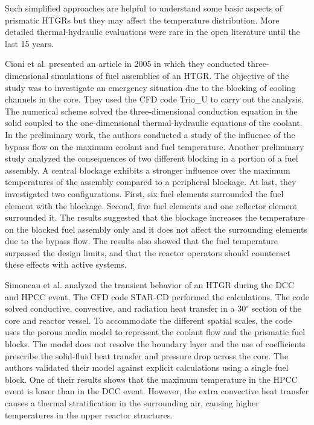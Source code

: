 \documentclass[11pt,letterpaper]{article}
\begin{document}
Such simplified approaches are helpful to understand some basic aspects of prismatic \glspl{HTGR} but they may affect the temperature distribution.
More detailed thermal-hydraulic evaluations were rare in the open literature until the last 15 years.

Cioni et al. \cite{cioni_3d_2006} presented an article in 2005 in which they conducted three-dimensional simulations of fuel assemblies of an \gls{HTGR}.
The objective of the study was to investigate an emergency situation due to the blocking of cooling channels in the core.
They used the \gls{CFD} code Trio_U \cite{bieder_priceles_2000} to carry out the analysis.
The numerical scheme solved the three-dimensional conduction equation in the solid coupled to the one-dimensional thermal-hydraulic equations of the coolant.
In the preliminary work, the authors conducted a study of the influence of the bypass flow on the maximum coolant and fuel temperature.
Another preliminary study analyzed the consequences of two different blocking in a portion of a fuel assembly.
A central blockage exhibits a stronger influence over the maximum temperatures of the assembly compared to a peripheral blockage.
At last, they investigated two configurations.
First, six fuel elements surrounded the fuel element with the blockage.
Second, five fuel elements and one reflector element surrounded it.
The results suggested that the blockage increases the temperature on the blocked fuel assembly only and it does not affect the surrounding elements due to the bypass flow.
The results also showed that the fuel temperature surpassed the design limits, and that the reactor operators should counteract these effects with active systems.

Simoneau et al. \cite{simoneau_three-dimensional_2007} analyzed the transient behavior of an \gls{HTGR} during the \gls{DCC} and \gls{HPCC} event.
The CFD code STAR-CD \cite{computational_dynamics_limited_star-cd_2004} performed the calculations.
The code solved conductive, convective, and radiation heat transfer in a 30$^{\circ}$ section of the core and reactor vessel.
To accommodate the different spatial scales, the code uses the porous media model to represent the coolant flow and the prismatic fuel blocks.
The model does not resolve the boundary layer and the use of coefficients prescribe the solid-fluid heat transfer and pressure drop across the core.
The authors validated their model against explicit calculations using a single fuel block.
One of their results shows that the maximum temperature in the \gls{HPCC} event is lower than in the \gls{DCC} event.
However, the extra convective heat transfer causes a thermal stratification in the surrounding air, causing higher temperatures in the upper reactor structures.
\end{document}
